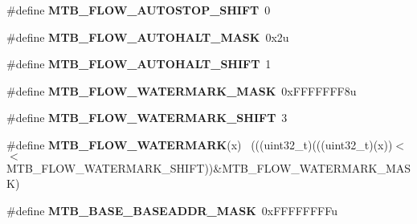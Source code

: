\begin{DoxyCompactItemize}
\item 
\hypertarget{group___m_t_b___register___masks_gacd0f126527ae40477d013b771e5103ee}{}\#define {\bfseries M\+T\+B\+\_\+\+F\+L\+O\+W\+\_\+\+A\+U\+T\+O\+S\+T\+O\+P\+\_\+\+S\+H\+I\+F\+T}~0\label{group___m_t_b___register___masks_gacd0f126527ae40477d013b771e5103ee}

\item 
\hypertarget{group___m_t_b___register___masks_ga6be5a7f0961e0862f4d2d270f0524a51}{}\#define {\bfseries M\+T\+B\+\_\+\+F\+L\+O\+W\+\_\+\+A\+U\+T\+O\+H\+A\+L\+T\+\_\+\+M\+A\+S\+K}~0x2u\label{group___m_t_b___register___masks_ga6be5a7f0961e0862f4d2d270f0524a51}

\item 
\hypertarget{group___m_t_b___register___masks_ga6791ae220dbaca3c5866b664c56c0b56}{}\#define {\bfseries M\+T\+B\+\_\+\+F\+L\+O\+W\+\_\+\+A\+U\+T\+O\+H\+A\+L\+T\+\_\+\+S\+H\+I\+F\+T}~1\label{group___m_t_b___register___masks_ga6791ae220dbaca3c5866b664c56c0b56}

\item 
\hypertarget{group___m_t_b___register___masks_ga381f94c6e6980a65bb9fbc594dd688bd}{}\#define {\bfseries M\+T\+B\+\_\+\+F\+L\+O\+W\+\_\+\+W\+A\+T\+E\+R\+M\+A\+R\+K\+\_\+\+M\+A\+S\+K}~0x\+F\+F\+F\+F\+F\+F\+F8u\label{group___m_t_b___register___masks_ga381f94c6e6980a65bb9fbc594dd688bd}

\item 
\hypertarget{group___m_t_b___register___masks_ga0307292719da2a56557ce153eada2315}{}\#define {\bfseries M\+T\+B\+\_\+\+F\+L\+O\+W\+\_\+\+W\+A\+T\+E\+R\+M\+A\+R\+K\+\_\+\+S\+H\+I\+F\+T}~3\label{group___m_t_b___register___masks_ga0307292719da2a56557ce153eada2315}

\item 
\hypertarget{group___m_t_b___register___masks_ga86a7fb458f49ef3d08ddea6fbccd883c}{}\#define {\bfseries M\+T\+B\+\_\+\+F\+L\+O\+W\+\_\+\+W\+A\+T\+E\+R\+M\+A\+R\+K}(x)                                    ~(((uint32\+\_\+t)(((uint32\+\_\+t)(x))$<$$<$M\+T\+B\+\_\+\+F\+L\+O\+W\+\_\+\+W\+A\+T\+E\+R\+M\+A\+R\+K\+\_\+\+S\+H\+I\+F\+T))\&M\+T\+B\+\_\+\+F\+L\+O\+W\+\_\+\+W\+A\+T\+E\+R\+M\+A\+R\+K\+\_\+\+M\+A\+S\+K)\label{group___m_t_b___register___masks_ga86a7fb458f49ef3d08ddea6fbccd883c}

\item 
\hypertarget{group___m_t_b___register___masks_ga9aabef14f0b7a38e25f049f289273193}{}\#define {\bfseries M\+T\+B\+\_\+\+B\+A\+S\+E\+\_\+\+B\+A\+S\+E\+A\+D\+D\+R\+\_\+\+M\+A\+S\+K}~0x\+F\+F\+F\+F\+F\+F\+F\+Fu\label{group___m_t_b___register___masks_ga9aabef14f0b7a38e25f049f289273193}


\end{DoxyCompactItemize}
